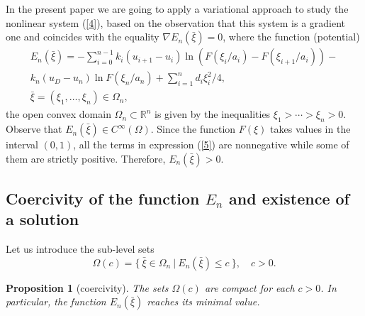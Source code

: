 \documentclass[12pt]{article}
\theoremstyle{plain}
\newtheorem{proposition}{Proposition}[section]
\theoremstyle{definition}
\numberwithin{equation}{section}
\newcommand{\R}{{\mathbb R}}
\begin{document}
In the present paper we are going to apply a variational approach to study the nonlinear system (\ref{4}), based on the observation that this system is a gradient one and coincides with the equality
$\nabla E_n(\bar\xi)=0$, where the function (potential)
\begin{align}\label{5}
E_n(\bar\xi)=-\sum_{i=0}^{n-1}  k_i(u_{i+1}-u_i)\ln (F(\xi_i/a_i)-F(\xi_{i+1}/a_i))-\nonumber\\  k_n(u_D-u_n)\ln F(\xi_n/a_n)+\sum_{i=1}^n d_i\xi_i^2/4, \\ \nonumber \bar\xi=(\xi_1,\ldots,\xi_n)\in\Omega_n,
\end{align}
the open convex domain $\Omega_n\subset\R^n$ is given by the inequalities $\xi_1>\cdots>\xi_n>0$.
Observe that $E_n(\bar\xi)\in C^\infty(\Omega)$. Since the function $F(\xi)$ takes values in the interval $(0,1)$, all the terms in expression (\ref{5}) are nonnegative while some of them are strictly positive. Therefore, $E_n(\bar\xi)>0$.

\subsection{Coercivity of the function $E_n$ and existence of a solution}

Let us introduce the sub-level sets \[\Omega(c)=\{ \ \bar\xi\in\Omega_n \ | \ E_n(\bar\xi)\le c \ \}, \quad c>0.\]

\begin{proposition}[coercivity]\label{th1}
The sets $\Omega(c)$ are compact for each $c>0$.
In particular, the function $E_n(\bar\xi)$ reaches its minimal value.
\end{proposition}
\end{document}
